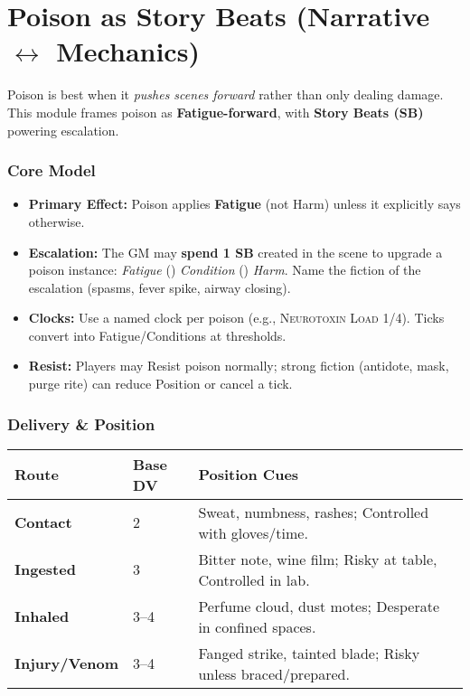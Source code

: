 \clearpage

\chapter{Poison as Story Beats (Narrative \texorpdfstring{$\leftrightarrow$}{↔} Mechanics)}\label{sec:poison-sb}

Poison is best when it \emph{pushes scenes forward} rather than only dealing damage. This module frames poison as \textbf{Fatigue-forward}, with \textbf{Story Beats (SB)} powering escalation.

\subsection*{Core Model}
\begin{itemize}
\item \textbf{Primary Effect:} Poison applies \textbf{Fatigue} (not Harm) unless it explicitly says otherwise.
\item \textbf{Escalation:} The GM may \textbf{spend 1 SB} created in the scene to upgrade a poison instance: \emph{Fatigue} (\to) \emph{Condition} (\to) \emph{Harm}. Name the fiction of the escalation (spasms, fever spike, airway closing).
\item \textbf{Clocks:} Use a named clock per poison (e.g., \textsc{Neurotoxin Load} 1/4). Ticks convert into Fatigue/Conditions at thresholds.
\item \textbf{Resist:} Players may Resist poison normally; strong fiction (antidote, mask, purge rite) can reduce Position or cancel a tick.
\end{itemize}

\subsection*{Delivery \& Position}
\begin{tabularx}{\linewidth}{>{\bfseries}l l X}
\toprule
Route & Base DV & Position Cues \\
\midrule
Contact & 2 & Sweat, numbness, rashes; Controlled with gloves/time. \\
Ingested & 3 & Bitter note, wine film; Risky at table, Controlled in lab. \\
Inhaled & 3--4 & Perfume cloud, dust motes; Desperate in confined spaces. \\
Injury/Venom & 3--4 & Fanged strike, tainted blade; Risky unless braced/prepared. \\
\bottomrule
\end{tabularx}

